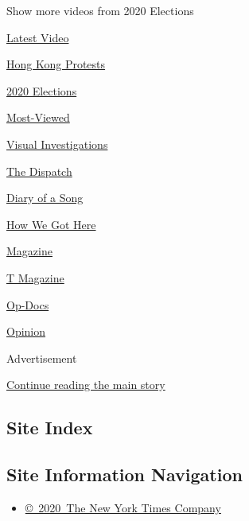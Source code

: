 Show more videos from 2020 Elections

\href{/video}{}

\href{/video/latest-video}{Latest Video}

\href{/video/hk-protest}{Hong Kong Protests}

\href{/video/2020-Elections}{2020 Elections}

\href{/video/Most-Viewed}{Most-Viewed}

\href{/video/investigations}{Visual Investigations}

\href{/video/on-the-ground}{The Dispatch}

\href{/video/diaryofasong}{Diary of a Song}

\href{/video/how-we-got-here}{How We Got Here}

\href{/video/magazine}{Magazine}

\href{/video/t-magazine}{T Magazine}

\href{/video/op-docs}{Op-Docs}

\href{/video/opinion}{Opinion}

Advertisement

\protect\hyperlink{after-bottom}{Continue reading the main story}

\hypertarget{site-index}{%
\subsection{Site Index}\label{site-index}}

\hypertarget{site-information-navigation}{%
\subsection{Site Information
Navigation}\label{site-information-navigation}}

\begin{itemize}
\tightlist
\item
  \href{https://help.nytimes.com/hc/en-us/articles/115014792127-Copyright-notice}{©~2020~The
  New York Times Company}
\end{itemize}

